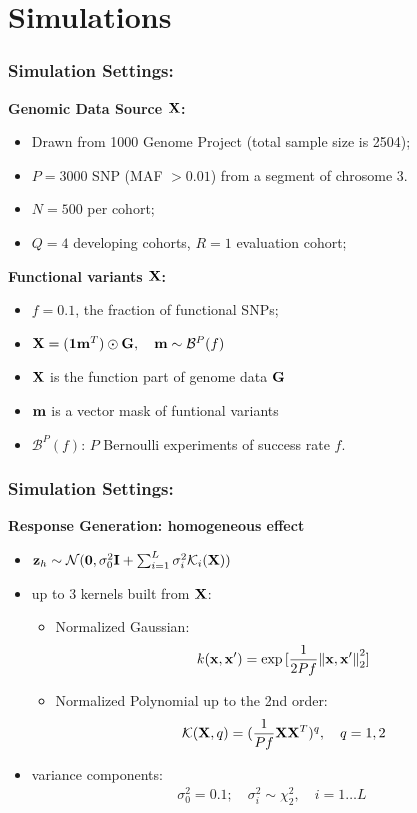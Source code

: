 \documentclass{beamer}
\begin{document}
\section{Simulations}
\begin{frame}
  \frametitle{Simulation Settings:} \textbf{Genomic Data Source
    $\mathbf{X}$:}
  \begin{itemize}
  \item Drawn from 1000 Genome Project (total sample size is 2504);
  \item $P=3000$ SNP (MAF $> 0.01$) from a segment of chrosome 3.
  \item $N=500$ per cohort;
  \item $Q=4$ developing cohorts, $R=1$ evaluation cohort;
  \end{itemize}
  \textbf{Functional variants $\mathbf{X}$:}
  \begin{itemize}
  \item $f = 0.1$, the fraction of functional SNPs;
  \item $\mathbf{X} = (\mathbf{1}\mathbf{m}^T) \odot \mathbf{G}, \quad \mathbf{m} \sim \mathcal{B}^P(f)$
  \item $\mathbf{X}$ is the function part of genome data $\mathbf{G}$
  \item $\mathbf{m}$ is a vector mask of funtional variants
  \item $\mathcal{B}^P(f)$: $P$ Bernoulli experiments of success rate
    $f$.
  \end{itemize}
\end{frame}
\begin{frame}
  \frametitle{Simulation Settings:}%
  \textbf{Response Generation: homogeneous effect}
  \begin{itemize}
  \item
    $ \mathbf{z}_h \sim \mathcal{N}(\boldsymbol{0}, \sigma^2_0 \textbf{I} + \sum_{i=1}^L
    \sigma_i^2 \mathcal{K}_i(\mathbf{X}))$
  \item up to 3 kernels built from $\mathbf{X}$:
    \begin{itemize}
    \item Normalized Gaussian:
      \begin{align}
        k(\mathbf{x}, \mathbf{x}^\prime)= \exp{[\frac{1}{2Pf}{\left\lVert\mathbf{x}, \mathbf{x}^\prime\right\rVert_2^2}]}
      \end{align}
    \item Normalized Polynomial up to the 2nd order:
      \begin{align}
        \mathcal{K}(\mathbf{X}, q)=(\frac{1}{Pf}\mathbf{X}\mathbf{X}^T)^q, \quad q={1, 2}
      \end{align}
    \end{itemize}
  \item variance components:
    \begin{align*}
      \sigma_0^2 = 0.1; \quad \sigma^2_i \sim \chi^2_2, \quad i = 1 \dots L
    \end{align*}
  \end{itemize}
\end{frame}
\end{document}
